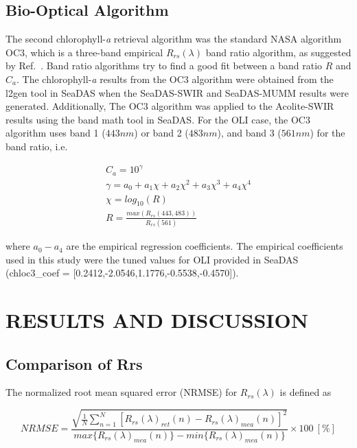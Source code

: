 \documentclass[]{spie}  %
\begin{document}
\subsection{Bio-Optical Algorithm}
The second chlorophyll-{\it a} retrieval algorithm was the standard NASA algorithm OC3\cite{OReilly2000}, which is a three-band empirical $R_{rs}(\lambda)$ band ratio algorithm, as suggested by Ref.~\cite{Franz:2015}. Band ratio algorithms try to find a good fit between a band ratio $R$ and $C_a$. The chlorophyll-{\it a} results from the OC3 algorithm were obtained from the l2gen tool in SeaDAS when the SeaDAS-SWIR and SeaDAS-MUMM results were generated. Additionally, The OC3 algorithm was applied to the Acolite-SWIR results using the band math tool in SeaDAS. For the OLI case, the OC3 algorithm uses band 1 ($443nm$) or band 2 ($483nm$), and band 3 ($561nm$) for the band ratio, i.e.

\begin{equation}
\begin{gathered}
	C_a = 10^{\gamma}\\
	\gamma = a_0+a_1\chi+a_2\chi^2+a_3\chi^3+a_4\chi^4\\
	\chi = log_{10}(R)\\
	R = \frac{max(R_{rs}(443,483))}{R_{rs}(561)}
\end{gathered}
\end{equation}

\noindent where $a_0-a_4$ are the empirical regression coefficients. The empirical coefficients used in this study were the tuned values for OLI provided in SeaDAS (chloc3\_coef = [0.2412,-2.0546,1.1776,-0.5538,-0.4570]).

\section{RESULTS AND DISCUSSION}
\label{sec:results}  %
\subsection{Comparison of Rrs}
The normalized root mean squared error (NRMSE) for $R_{rs}(\lambda)$ is defined as

\begin{equation}
\label{eq:NRMSE}
	NRMSE =\frac{\sqrt{\frac{1}{N}\sum_{n=1}^N{\left[R_{rs}(\lambda)_{ret}(n) - R_{rs}(\lambda)_{mea}(n)\right]^2}}}{max\{R_{rs}(\lambda)_{mea}(n)\} - min\{R_{rs}(\lambda)_{mea}(n)\}}\times100 ~[\%]
\end{equation}
\end{document}
